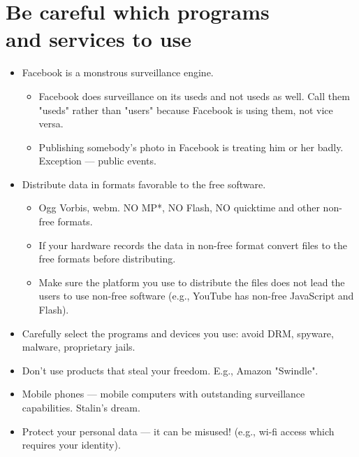 \documentclass[twoside,openright]{report}
\begin{document}
\section[Be careful which programs and services to use]{Be careful which programs\\ and services to use }
\begin{itemize}
 \item    Facebook is a monstrous surveillance engine.
\begin{itemize}
 \item        Facebook does surveillance on its useds and not useds as well. Call them "useds" rather than "users" because Facebook is using them, not vice versa.
 \item        Publishing somebody's photo in Facebook is treating him or her badly. Exception --- public events.
\end{itemize}
  \item   Distribute data in formats favorable to the free software.
\begin{itemize}
 \item        Ogg Vorbis, webm. NO MP*, NO Flash, NO quicktime and other non-free formats.
 \item        If your hardware records the data in non-free format convert files to the free formats before distributing.
 \item        Make sure the platform you use to distribute the files does not lead the users to use non-free software (e.g., YouTube has non-free JavaScript and Flash).
\end{itemize}
  \item   Carefully select the programs and devices you use: avoid DRM, spyware, malware, proprietary jails.
  \item   Don't use products that steal your freedom. E.g., Amazon "Swindle".
 \item    Mobile phones --- mobile computers with outstanding surveillance capabilities. Stalin's dream.
 \item    Protect your personal data --- it can be misused! (e.g., wi-fi access which requires your identity).
\end{itemize}
\end{document}
